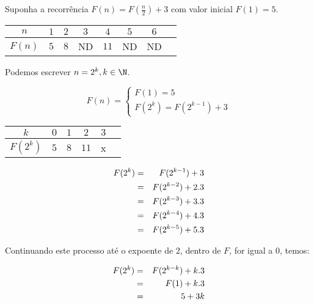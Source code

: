 \documentclass[a4paper]{memoir}
\begin{document}
\begin{ex}
Suponha a recorrência $F(n) = F \left( \frac{n}{2} \right) + 3$ com valor inicial $F(1) = 5$.
\end{ex}

\begin{sol}
\begin{center}
\begin{tabular}{|c*{7}{|c}}
\hline
$n$ & $1$ & $2$ & $3$ & $4$ & $5$ & $6$\\ \hline
$F(n)$ & $5$ & $8$ & ND & $11$ & ND & ND\\ \hline
\end{tabular}
\end{center}

Podemos escrever $n = 2^k, k \in \N$.

\begin{equation*}
  F(n) =
  \begin{cases}
    F(1)=5 \\
    F(2^k) = F(2^{k-1}) + 3
  \end{cases}
\end{equation*}

\begin{center}
\begin{tabular}{|c*{5}{|c}}
\hline
$k$ & $0$ & $1$ & $2$ & $3$\\ \hline
$F(2^k)$ & $5$ & $8$ & $11$ & x\\ \hline
\end{tabular}
\end{center}

\begin{eqnarray*}
  F(2^k) &=& F(2^{k - 1}) + 3 \hfill \\
   &=& F(2^{k - 2}) + 2.3 \hfill \\
   &=& F(2^{k - 3}) + 3.3 \hfill \\
   &=& F(2^{k - 4}) + 4.3 \hfill \\
   &=& F(2^{k - 5}) + 5.3 \hfill \\ 
\end{eqnarray*}

\newpage 

Continuando este processo até o expoente de $2$, dentro de $F$, for igual a $0$, temos:

\begin{eqnarray*}
  F(2^k) &=& F(2^{k - k}) + k.3 \hfill \\
   &=& F(1) + k.3 \hfill \\
   &=& 5 + 3k \hfill \\ 
\end{eqnarray*}


\end{sol}
\end{document}

